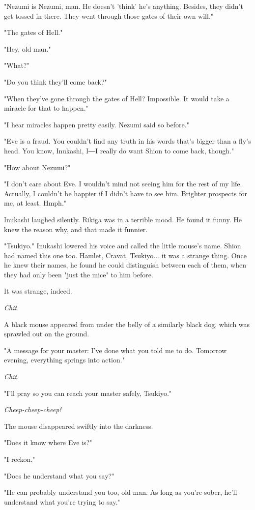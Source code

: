 "Nezumi is Nezumi, man. He doesn't 'think' he's anything. Besides, they
didn't get tossed in there. They went through those gates of their own
will."

"The gates of Hell."

"Hey, old man."

"What?"

"Do you think they'll come back?"

"When they've gone through the gates of Hell? Impossible. It would take
a miracle for that to happen."

"I hear miracles happen pretty easily. Nezumi said so before."

"Eve is a fraud. You couldn't find any truth in his words that's bigger
than a fly's head. You know, Inukashi, I―I really do want Shion to come
back, though."

"How about Nezumi?"

"I don't care about Eve. I wouldn't mind not seeing him for the rest of
my life. Actually, I couldn't be happier if I didn't have to see him.
Brighter prospects for me, at least. Hmph."

Inukashi laughed silently. Rikiga was in a terrible mood. He found it
funny. He knew the reason why, and that made it funnier.

"Tsukiyo." Inukashi lowered his voice and called the little mouse's
name. Shion had named this one too. Hamlet, Cravat, Tsukiyo... it was a
strange thing. Once he knew their names, he found he could distinguish
between each of them, when they had only been "just the mice" to him
before.

It was strange, indeed.

\emph{Chit.}

A black mouse appeared from under the belly of a similarly black dog,
which was sprawled out on the ground.

"A message for your master: I've done what you told me to do. Tomorrow
evening, everything springs into action."

\emph{Chit.}

"I'll pray so you can reach your master safely, Tsukiyo."

\emph{Cheep-cheep-cheep!}

The mouse disappeared swiftly into the darkness.

"Does it know where Eve is?"

"I reckon."

"Does he understand what you say?"

"He can probably understand you too, old man. As long as you're sober,
he'll understand what you're trying to say."

